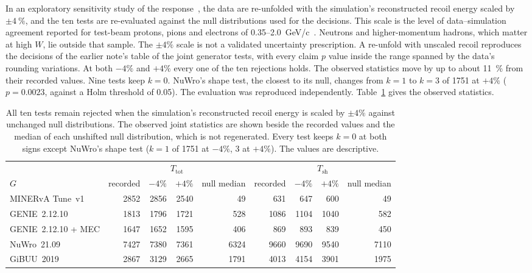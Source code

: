 In an exploratory sensitivity study of the response~\cite{JointTestRecoil2026}, the data are re-unfolded with the simulation's reconstructed recoil energy scaled by $\pm\SI{4}{\percent}$, and the ten tests are re-evaluated against the null distributions used for the decisions. This scale is the level of data--simulation agreement reported for test-beam protons, pions and electrons of 0.35--\SI{2.0}{GeV/c}~\cite{MINERvA:2015testbeam}. Neutrons and higher-momentum hadrons, which matter at high $W$, lie outside that sample. The $\pm4\%$ scale is not a validated uncertainty prescription. A re-unfold with unscaled recoil reproduces the decisions of the earlier note's table of the joint generator tests, with every claim $p$ value inside the range spanned by the data's rounding variations. At both $-4\%$ and $+4\%$ every one of the ten rejections holds. The observed statistics move by up to about \SI{11}{\percent} from their recorded values. Nine tests keep $k=0$. NuWro's shape test, the closest to its null, changes from $k=1$ to $k=3$ of 1751 at $+4\%$ ($p=0.0023$, against a Holm threshold of 0.05). The evaluation was reproduced independently. Table~\ref{tab:joint5d-recoil} gives the observed statistics.

\begin{table}[htbp]
  \caption[Descriptive recoil-scale sensitivity of the observed statistics]{All ten tests remain rejected when the simulation's reconstructed recoil energy is scaled by $\pm4\%$ against unchanged null distributions. The observed joint statistics are shown beside the recorded values and the median of each unshifted null distribution, which is not regenerated. Every test keeps $k=0$ at both signs except NuWro's shape test ($k=1$ of 1751 at $-4\%$, 3 at $+4\%$). The values are descriptive.}
  \label{tab:joint5d-recoil}
  \centering\small
  \begin{tabular}{@{}lrrrrrrrr@{}}
    \toprule
    & \multicolumn{4}{c}{$T_{\mathrm{tot}}$} & \multicolumn{4}{c}{$T_{\mathrm{sh}}$} \\
    \cmidrule(lr){2-5}\cmidrule(lr){6-9}
    $G$ & recorded & $-4\%$ & $+4\%$ & null median & recorded & $-4\%$ & $+4\%$ & null median \\
    \midrule
    MINERvA Tune~v1     & 2852 & 2856 & 2540 & 49   & 631  & 647  & 600  & 49 \\
    GENIE~2.12.10       & 1813 & 1796 & 1721 & 528  & 1086 & 1104 & 1040 & 582 \\
    GENIE~2.12.10 + MEC & 1647 & 1652 & 1595 & 406  & 869  & 893  & 839  & 450 \\
    NuWro~21.09         & 7427 & 7380 & 7361 & 6324 & 9660 & 9690 & 9540 & 7110 \\
    GiBUU~2019          & 2867 & 3129 & 2665 & 1791 & 4013 & 4154 & 3901 & 1975 \\
    \bottomrule
  \end{tabular}
\end{table}

